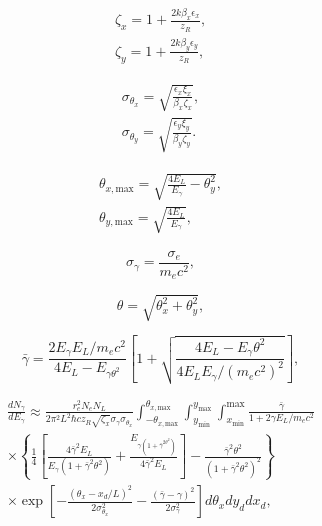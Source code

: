 \documentclass[../main.tex]{subfiles}
\begin{document}
\begin{gather}
\zeta_{x} = 1+\frac{2k\beta_{x}\epsilon_{x}}{z_{R}}, \\
\zeta_{y} = 1+\frac{2k\beta_{y}\epsilon_{y}}{z_{R}},
\label{eq:zeta_parameters_sun}
\end{gather}

\begin{gather}
\sigma_{\theta_{x}} = \sqrt{\frac{\epsilon_{x}\xi_{x}}{\beta_{x}\zeta_{x}}}, \\
\sigma_{\theta_{y}} = \sqrt{\frac{\epsilon_{y}\xi_{y}}{\beta_{y}\zeta_{y}}}.
\label{eq:sigmatheta_parameters_sun}
\end{gather}

\begin{gather}
\theta_{x,\mathrm{max}} = \sqrt{\frac{4E_{L}}{E_{\gamma}}-\theta_{y}^{2}}, \\
\theta_{y,\mathrm{max}} = \sqrt{\frac{4E_{L}}{E_{\gamma}}},
\label{eq:theta_max_parameter_sun}
\end{gather}

\begin{equation}
\sigma_{\gamma} = \frac{\sigma_{e}}{m_{e}c^{2}},
\label{eq:gamma_energy_spread}
\end{equation}

\begin{equation}
\theta = \sqrt{\theta_{x}^{2}+\theta_{y}^{2}},
\label{eq:theta_angle_sun}
\end{equation}

\begin{equation}
\bar{\gamma} = \frac{2E_{\gamma}E_{L}/m_{e}c^{2}}{4E_{L}-E_{\gamma\theta^{2}}}\left[1+\sqrt{\frac{4E_{L}-E_{\gamma}\theta^{2}}{4E_{L}E_{\gamma}/\left(m_{e}c^{2}\right)^{2}}}\right],  
\label{eq:gamma_bar_sun}
\end{equation}

\begin{multline}
\frac{dN_{\gamma}}{dE_{\gamma}} \approx \frac{r_{e}^{2}N_{e}N_{L}}{2\pi^{2}L^{2}\hbar c z_{R}\sqrt{\zeta_{x}}\sigma_{\gamma}\sigma_{\theta_{x}}}\int_{-\theta_{x,\mathrm{max}}}^{\theta_{x,\mathrm{max}}}\int_{y_{\mathrm{min}}}^{y_{\mathrm{max}}}\int_{x_{\mathrm{min}}}^{\mathrm{max}}\frac{\bar{\gamma}}{1+2\gamma E_{L}/m_{e}c^{2}} \\
\times\left\{\frac{1}{4}\left[\frac{4\bar{\gamma}^{2}E_{L}}{E_{\gamma}\left(1+\bar{\gamma}^{2}\theta^{2}\right)}+\frac{E_{\gamma\left(1+\bar{\gamma}^{2\theta^{2}}\right)}}{4\bar{\gamma}^{2}E_{L}}\right]-\frac{\bar{\gamma}^{2}\theta^{2}}{\left(1+\bar{\gamma}^{2}\theta^{2}\right)^{2}}\right\} \\
\times\exp{\left[-\frac{\left(\theta_{x}-x_{d}/L\right)^{2}}{2\sigma_{\theta_{x}}^{2}}-\frac{\left(\bar{\gamma}-\gamma\right)^{2}}{2\sigma_{\gamma}^{2}}\right]}d\theta_{x}dy_{d}dx_{d},
\label{eq:1D_sun_equation}    
\end{multline}
    
\end{document}
